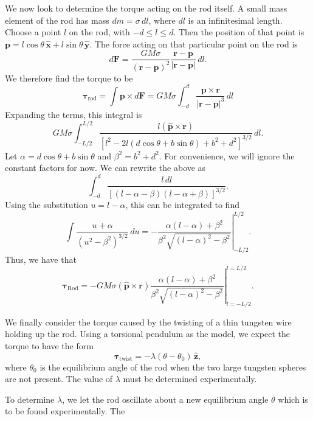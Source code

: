 \documentclass[aps, reprint,amsmath,amssymb]{revtex4-1} %
\renewcommand{\vec}[1]{\boldsymbol{#1}}
\newcommand{\uv}[1]{\vec{\hat{#1}}}
\newcommand{\x}{\vec{\hat{x}}}
\newcommand{\y}{\vec{\hat{y}}}
\newcommand{\z}{\vec{\hat{z}}}
\begin{document}
We now look to determine the torque acting on the rod itself. A small mass
element of the rod has mass $dm = \sigma\,dl$, where $dl$ is an
infinitesimal length. Choose a point $l$ on the rod, with $-d\leq l \leq
d$. Then the position of that point is $\vec{p} = l\cos\theta\,\x +
l\sin\theta\,\y$. The force acting on that particular point on the rod is
\[
    d\vec{F} = \frac{G M \sigma}{(\vec{r} - \vec{p})^2} \frac{\vec{r} -
    \vec{p}}{|\vec{r} - \vec{p}|} \, dl.
\]
We therefore find the torque to be
\begin{equation}
    \label{eq:almost_rod_torque}
    \vec{\tau}_\text{rod} = \int \vec{p} \times d\vec{F}
    = G M \sigma \int_{-d}^d \frac{\vec{p}\times\vec{r}}{|\vec{r} -
    \vec{p}|^3} \, dl
\end{equation}
Expanding the terms, this integral is
\[
    G M \sigma \int_{-L/2}^{L/2} \frac{l (\uv{p} \times \vec{r}) }
{[l^2 - 2l (d \cos \theta + b \sin \theta) + b^2 + d^2]^{3/2}}\, dl.
\]
Let $\alpha = d \cos \theta + b \sin \theta$ and $\beta^2 = b^2 + d^2$.
For convenience, we will ignore the constant factors for now. 
We can rewrite the above as
\[
    \int_{-d}^{d} \frac{l\,dl}
    {[ (l - \alpha - \beta) (l - \alpha + \beta)]^{3/2}}.
\]
Using the substitution $u = l - \alpha$, this can be integrated to
find
\[
    \int \frac{u + \alpha}{(u^2 - \beta^2)^{3/2}}\,du
    = -\left.\frac{\alpha (l-\alpha) + \beta^2}
    {\beta^2 \sqrt{(l-\alpha)^2 - \beta^2}} \right|_{-L/2}^{L/2}.
\]
Thus, we have that
\begin{equation}\label{eq:rod_torque}
    \vec{\tau}_\text{Rod} = - G M \sigma (\uv{p}\times\vec{r}) 
    \left.
    \frac{\alpha (l - \alpha) + \beta^2}
    {\beta^2 \sqrt{(l-\alpha)^2 - \beta^2}}
    \right|_{l=-L/2}^{l = L/2}.
\end{equation}

We finally consider the torque caused by the twisting of a thin tungsten
wire holding up the rod. Using a torsional pendulum as the model, we expect
the torque to have the form
\begin{equation}
    \label{eq:torsional_pendulum}
    \vec{\tau}_\text{twist} = - \lambda (\theta - \theta_0) \,\z,
\end{equation}
where $\theta_0$ is the equilibrium angle of the rod when the two large
tungsten spheres are not present. The value of $\lambda$ must be determined
experimentally. 

To determine $\lambda$, we let the rod oscillate about a new equilibrium
angle $\theta$ which is to be found experimentally. The
\end{document}
